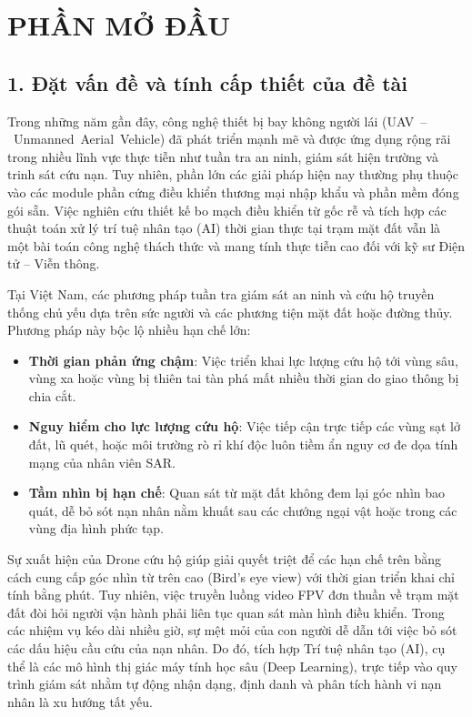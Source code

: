 \section*{PHẦN MỞ ĐẦU}
\setcounter{section}{0}
\setcounter{subsection}{0}
\setcounter{figure}{0}
\setcounter{table}{0}

\subsection*{1. Đặt vấn đề và tính cấp thiết của đề tài}

Trong những năm gần đây, công nghệ thiết bị bay không người lái (\mbox{UAV -- Unmanned Aerial Vehicle}) đã phát triển mạnh mẽ và được ứng dụng rộng rãi trong nhiều lĩnh vực thực tiễn như tuần tra an ninh, giám sát hiện trường và trinh sát cứu nạn. Tuy nhiên, phần lớn các giải pháp hiện nay thường phụ thuộc vào các module phần cứng điều khiển thương mại nhập khẩu và phần mềm đóng gói sẵn. Việc nghiên cứu thiết kế bo mạch điều khiển từ gốc rễ và tích hợp các thuật toán xử lý trí tuệ nhân tạo (AI) thời gian thực tại trạm mặt đất vẫn là một bài toán công nghệ thách thức và mang tính thực tiễn cao đối với kỹ sư Điện tử -- Viễn thông.

Tại Việt Nam, các phương pháp tuần tra giám sát an ninh và cứu hộ truyền thống chủ yếu dựa trên sức người và các phương tiện mặt đất hoặc đường thủy. Phương pháp này bộc lộ nhiều hạn chế lớn:
\begin{itemize}
    \item \textbf{Thời gian phản ứng chậm}: Việc triển khai lực lượng cứu hộ tới vùng sâu, vùng xa hoặc vùng bị thiên tai tàn phá mất nhiều thời gian do giao thông bị chia cắt.
    \item \textbf{Nguy hiểm cho lực lượng cứu hộ}: Việc tiếp cận trực tiếp các vùng sạt lở đất, lũ quét, hoặc môi trường rò rỉ khí độc luôn tiềm ẩn nguy cơ đe dọa tính mạng của nhân viên SAR.
    \item \textbf{Tầm nhìn bị hạn chế}: Quan sát từ mặt đất không đem lại góc nhìn bao quát, dễ bỏ sót nạn nhân nằm khuất sau các chướng ngại vật hoặc trong các vùng địa hình phức tạp.
\end{itemize}

Sự xuất hiện của Drone cứu hộ giúp giải quyết triệt để các hạn chế trên bằng cách cung cấp góc nhìn từ trên cao (Bird's eye view) với thời gian triển khai chỉ tính bằng phút. Tuy nhiên, việc truyền luồng video FPV đơn thuần về trạm mặt đất đòi hỏi người vận hành phải liên tục quan sát màn hình điều khiển. Trong các nhiệm vụ kéo dài nhiều giờ, sự mệt mỏi của con người dễ dẫn tới việc bỏ sót các dấu hiệu cầu cứu của nạn nhân. Do đó, tích hợp Trí tuệ nhân tạo (AI), cụ thể là các mô hình thị giác máy tính học sâu (Deep Learning), trực tiếp vào quy trình giám sát nhằm tự động nhận dạng, định danh và phân tích hành vi nạn nhân là xu hướng tất yếu.

